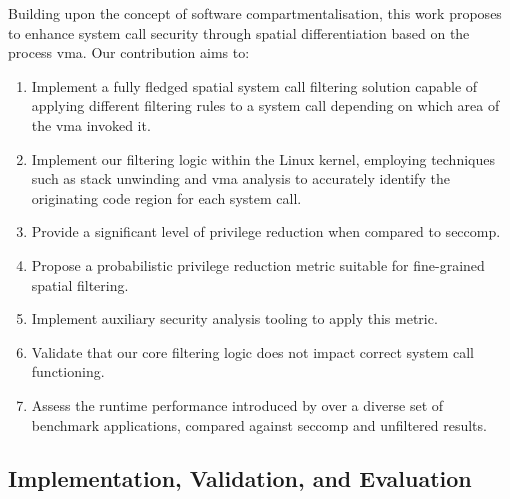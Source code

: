 Building upon the concept of software compartmentalisation, this work
proposes \af to enhance system call security through spatial
differentiation based on the process \ac{vma}. Our contribution aims to:

\begin{enumerate}
    \item Implement a fully fledged spatial system call filtering solution capable of applying different filtering rules to a system call depending on which area of the \ac{vma} invoked it.
    \item Implement our filtering logic within the Linux kernel, employing techniques such as stack unwinding and \ac{vma} analysis to accurately identify the originating code region for each system call.
    \item Provide a significant level of privilege reduction when compared to seccomp.
    \item Propose a probabilistic privilege reduction metric suitable for fine-grained spatial filtering. %
    \item Implement auxiliary security analysis tooling to apply this metric. %
    \item Validate that our core filtering logic does not impact correct system call functioning.
    \item Assess the runtime performance introduced by \af{} over a diverse set of benchmark applications, compared against seccomp and unfiltered results.
\end{enumerate}

%
%
%
\subsection{Implementation, Validation, and Evaluation}

